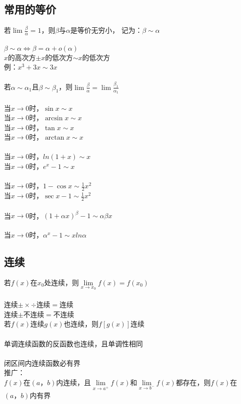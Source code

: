 \documentclass{article}
\begin{document}
\begin{flushleft}
\subsection{常用的等价}

若$\lim \frac{\beta}{\alpha}=1$，则$\beta$与$\alpha$是等价无穷小，
记为：$\beta \sim \alpha$\\
~\\
$\beta \sim \alpha \Leftrightarrow \beta = \alpha + o(\alpha)$\\
$x$的高次方$\pm x$的低次方$\sim x$的低次方\\
\qquad 例：$x^3+3x\sim 3x$\\
~\\
若$\alpha \sim \alpha_1$且$\beta \sim \beta_1$，则$\lim \frac{\beta}{\alpha} = \lim \frac{\beta_1}{\alpha_1}$\\
~\\
当$x\to 0$时，$\sin x \sim x$\\
当$x\to 0$时，$\arcsin x \sim x$\\
当$x\to 0$时，$\tan x \sim x$\\
当$x\to 0$时，$\arctan x \sim x$\\
~\\
当$x\to 0$时，$ln(1+x) \sim x$\\
当$x\to 0$时，$e^x-1 \sim x$\\
~\\
当$x\to 0$时，$1-\cos x \sim \frac{1}{2} x^2$\\
当$x\to 0$时，$\sec x - 1 \sim \frac{1}{2} x^2$\\
~\\
当$x\to 0$时，$(1+\alpha x)^\beta -1 \sim \alpha\beta x$\\
~\\
当$x\to 0$时，$\alpha^x -1 \sim xln\alpha$\\

\subsection{连续}

若$f(x)$在$x_0$处连续，则$\lim\limits_{x\to x_0} f(x)=f(x_0)$\\
~\\
连续$\pm\times\div$连续$=$连续\\
连续$\pm$不连续$=$不连续\\
若$f(x)$连续$g(x)$也连续，则$f[g(x)]$连续\\
~\\
单调连续函数的反函数也连续，且单调性相同\\
~\\
闭区间内连续函数必有界\\
推广：\\
$f(x)$在$(a，b)$内连续，且$\lim\limits_{x\to a^+} f(x)$和$\lim\limits_{x\to b^-} f(x)$都存在，则$f(x)$在$(a，b)$内有界\\
~\\

\end{flushleft}
\end{document}
